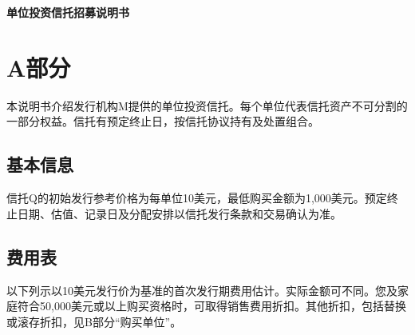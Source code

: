 \documentclass[UTF8,fontset=none,11pt,a4paper]{ctexart}
\begin{document}
{\noindent\fontsize{20}{25}\selectfont\bfseries 单位投资信托招募说明书\par}
\vspace{10pt}
\section*{A部分}
本说明书介绍发行机构M提供的单位投资信托。每个单位代表信托资产不可分割的一部分权益。信托有预定终止日，按信托协议持有及\allowbreak\mbox{处置组合。}


\subsection*{基本信息}
信托Q的初始发行参考价格为每单位10美元，最低购买金额为1,000美元。预定终止日期、估值、记录日及分配安排以信托发行条款和交易\allowbreak\mbox{确认为准。}


\subsection*{费用表}
以下列示以10美元发行价为基准的首次发行期费用估计。实际金额可不同。您及家庭符合50,000美元或以上购买资格时，可取得销售费用折扣。其他折扣，包括替换或滚存折扣，见B部分“\allowbreak\mbox{购买单位”。}
\end{document}
